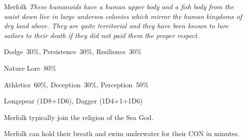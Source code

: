 \begin{monsterbox}{Merfolk}
	\textit{These humanoids have a human upper body and a fish body from the waist down live in large undersea colonies which mirror the human kingdoms of dry land above. They are quite territorial and they have been known to lure sailors to their death if they did not paid them the proper respect.}\\
	\rpghline
	\basics[%
        hitpoints  = 14,
	majorwound = 7,
	damagemodifier = +1D6,
	powerpoints = 11,
	movementrate = {23m swimming, 7m crawling in land},
	armor = None,
	plunderrating = 1
	]
	\rpghline%
	\stats[ %
		STR = 3D6+3 (14),
		CON = 3D6   (11),
		DEX = 2D6+6 (13),
		SIZ = 3D6+6 (17),
		INT = 3D6   (11),
		POW = 3D6   (11),
		CHA = 3D6   (11)
	]
	\rpghline%
	\begin{rpg-monsteraction}[Resistances]
		Dodge~30\%, Persistence~30\%, Resilience~30\%
	\end{rpg-monsteraction}
	\begin{rpg-monsteraction}[Knowledge]
		Nature Lore~80\%
	\end{rpg-monsteraction}
	\begin{rpg-monsteraction}[Practical]
		Athletics~60\%, Deception~30\%, Perception~50\%
	\end{rpg-monsteraction}
	\begin{rpg-monsteraction}
		Longspear (1D8+1D6), Dagger (1D4+1+1D6)
	\end{rpg-monsteraction}
	\begin{rpg-monsteraction}[Magic]
		Merfolk typically join the religion of the Sea God.
	\end{rpg-monsteraction}
	\begin{rpg-monsteraction}
		Merfolk can hold their breath and swim underwater for their CON in minutes.
	\end{rpg-monsteraction}

\end{monsterbox}


